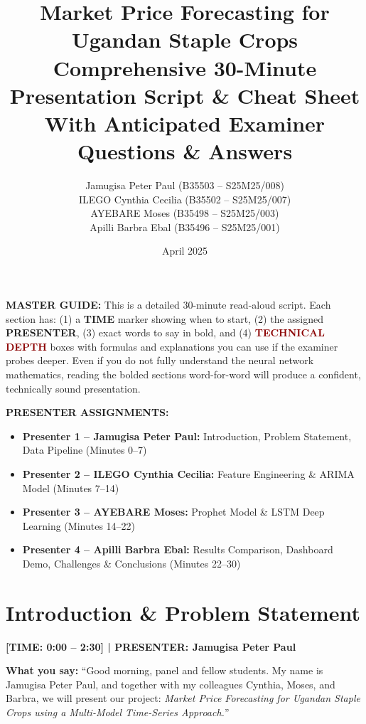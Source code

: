 \documentclass[11pt,a4paper]{article}
\title{\textbf{Market Price Forecasting for Ugandan Staple Crops} \\ \large Comprehensive 30-Minute Presentation Script \& Cheat Sheet \\ \vspace{0.3em} \normalsize With Anticipated Examiner Questions \& Answers}
\author{
Jamugisa Peter Paul (B35503 -- S25M25/008) \\
ILEGO Cynthia Cecilia (B35502 -- S25M25/007) \\
AYEBARE Moses (B35498 -- S25M25/003) \\
Apilli Barbra Ebal (B35496 -- S25M25/001)
}
\date{April 2025}
\begin{document}
\maketitle

\begin{mdframed}[backgroundcolor=yellow!10, linecolor=gray]
\textbf{MASTER GUIDE:} This is a detailed 30-minute read-aloud script. Each section has: (1) a \textcolor{timecolor}{\textbf{TIME}} marker showing when to start, (2) the assigned \textbf{PRESENTER}, (3) exact words to say in bold, and (4) \textcolor{darkred}{\textbf{TECHNICAL DEPTH}} boxes with formulas and explanations you can use if the examiner probes deeper. Even if you do not fully understand the neural network mathematics, reading the bolded sections word-for-word will produce a confident, technically sound presentation.
\end{mdframed}

\begin{mdframed}[backgroundcolor=blue!5, linecolor=darkblue]
\textbf{PRESENTER ASSIGNMENTS:}
\begin{itemize}[leftmargin=*]
    \item \textbf{Presenter 1 -- Jamugisa Peter Paul:} Introduction, Problem Statement, Data Pipeline (Minutes 0--7)
    \item \textbf{Presenter 2 -- ILEGO Cynthia Cecilia:} Feature Engineering \& ARIMA Model (Minutes 7--14)
    \item \textbf{Presenter 3 -- AYEBARE Moses:} Prophet Model \& LSTM Deep Learning (Minutes 14--22)
    \item \textbf{Presenter 4 -- Apilli Barbra Ebal:} Results Comparison, Dashboard Demo, Challenges \& Conclusions (Minutes 22--30)
\end{itemize}
\end{mdframed}

\tableofcontents
\newpage

\section{Introduction \& Problem Statement}
\textcolor{timecolor}{\textbf{[TIME: 0:00 -- 2:30] | PRESENTER: Jamugisa Peter Paul}}

\textbf{What you say:}
``Good morning, panel and fellow students. My name is Jamugisa Peter Paul, and together with my colleagues Cynthia, Moses, and Barbra, we will present our project: \textit{Market Price Forecasting for Ugandan Staple Crops using a Multi-Model Time-Series Approach.}''
\end{document}
